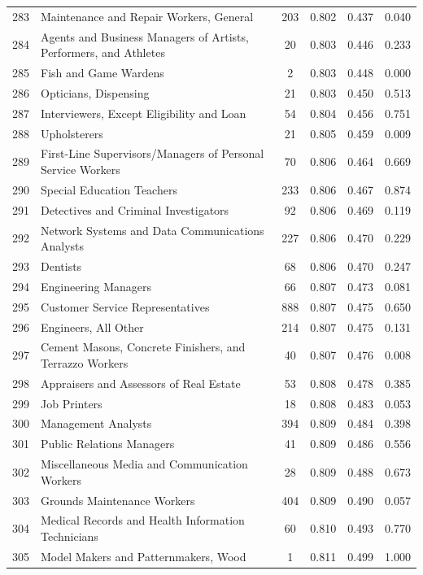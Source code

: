{\begin{longtable}{llcccc}
 283 & Maintenance and Repair Workers, General & 203 & 0.802 & 0.437 & 0.040 \\
 284 & Agents and Business Managers of Artists, Performers, and Athletes & 20 & 0.803 & 0.446 & 0.233 \\
 285 & Fish and Game Wardens & 2 & 0.803 & 0.448 & 0.000 \\
 286 & Opticians, Dispensing & 21 & 0.803 & 0.450 & 0.513 \\
 287 & Interviewers, Except Eligibility and Loan & 54 & 0.804 & 0.456 & 0.751 \\
 288 & Upholsterers & 21 & 0.805 & 0.459 & 0.009 \\
 289 & First-Line Supervisors/Managers of Personal Service Workers & 70 & 0.806 & 0.464 & 0.669 \\
 290 & Special Education Teachers & 233 & 0.806 & 0.467 & 0.874 \\
 291 & Detectives and Criminal Investigators & 92 & 0.806 & 0.469 & 0.119 \\
 292 & Network Systems and Data Communications Analysts & 227 & 0.806 & 0.470 & 0.229 \\
 293 & Dentists & 68 & 0.806 & 0.470 & 0.247 \\
 294 & Engineering Managers & 66 & 0.807 & 0.473 & 0.081 \\
 295 & Customer Service Representatives & 888 & 0.807 & 0.475 & 0.650 \\
 296 & Engineers, All Other & 214 & 0.807 & 0.475 & 0.131 \\
 297 & Cement Masons, Concrete Finishers, and Terrazzo Workers & 40 & 0.807 & 0.476 & 0.008 \\
 298 & Appraisers and Assessors of Real Estate & 53 & 0.808 & 0.478 & 0.385 \\
 299 & Job Printers & 18 & 0.808 & 0.483 & 0.053 \\
 300 & Management Analysts & 394 & 0.809 & 0.484 & 0.398 \\
 301 & Public Relations Managers & 41 & 0.809 & 0.486 & 0.556 \\
 302 & Miscellaneous Media and Communication Workers & 28 & 0.809 & 0.488 & 0.673 \\
 303 & Grounds Maintenance Workers & 404 & 0.809 & 0.490 & 0.057 \\
 304 & Medical Records and Health Information Technicians & 60 & 0.810 & 0.493 & 0.770 \\
 305 & Model Makers and Patternmakers, Wood & 1 & 0.811 & 0.499 & 1.000 \\

\end{longtable}}
